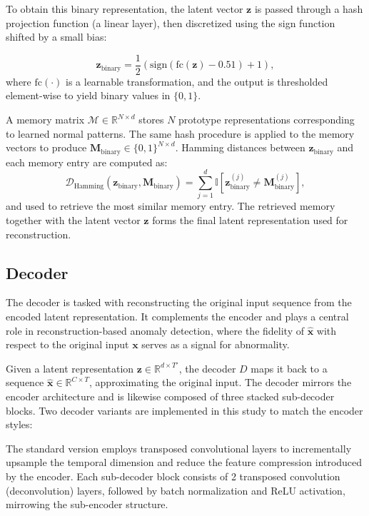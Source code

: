 To obtain this binary representation, the latent vector $\mathbf{z}$ is passed through a hash projection function (a linear layer), then discretized using the sign function shifted by a small bias:


\begin{equation}
\label{eq:hashing}
\mathbf{z}_{\text{binary}} = \frac{1}{2} \left( \text{sign}(\text{fc}(\mathbf{z}) - 0.51) + 1 \right),
\end{equation}
where $\text{fc}(\cdot)$ is a learnable transformation, and the output is thresholded element-wise to yield binary values in $\{0,1\}$.

A memory matrix $\mathcal{M} \in \mathbb{R}^{N \times d}$ stores $N$ prototype representations corresponding to learned normal patterns.
The same hash procedure is applied to the memory vectors to produce $\mathbf{M}_{\text{binary}} \in \{0,1\}^{N \times d}$.
Hamming distances between $\mathbf{z}_{\text{binary}}$ and each memory entry are computed as:
\begin{equation}
\mathcal{D}_{\text{Hamming}}(\mathbf{z}_{\text{binary}}, \mathbf{M}_{\text{binary}}) = \sum_{j=1}^{d} \mathbb{I} \left[ \mathbf{z}_{\text{binary}}^{(j)} \neq \mathbf{M}_{\text{binary}}^{(j)} \right],
\end{equation}
and used to retrieve the most similar memory entry.
The retrieved memory together with the latent vector $\mathbf{z}$ forms the final latent representation used for reconstruction.


\subsection{Decoder}
\label{subsec:decoder}

The decoder is tasked with reconstructing the original input sequence from the encoded latent representation.
It complements the encoder and plays a central role in reconstruction-based anomaly detection, where the fidelity of $\hat{\mathbf{x}}$ with respect to the original input $\mathbf{x}$ serves as a signal for abnormality.

Given a latent representation $\mathbf{z} \in \mathbb{R}^{d \times T'}$, the decoder $D$ maps it back to a sequence $\hat{\mathbf{x}} \in \mathbb{R}^{C \times T}$, approximating the original input.
The decoder mirrors the encoder architecture and is likewise composed of three stacked sub-decoder blocks.
Two decoder variants are implemented in this study to match the encoder styles:

The standard version employs transposed convolutional layers to incrementally upsample the temporal dimension and reduce the feature compression introduced by the encoder.
Each sub-decoder block consists of 2 transposed convolution (deconvolution) layers, followed by batch normalization and ReLU activation, mirrowing the sub-encoder structure. 

